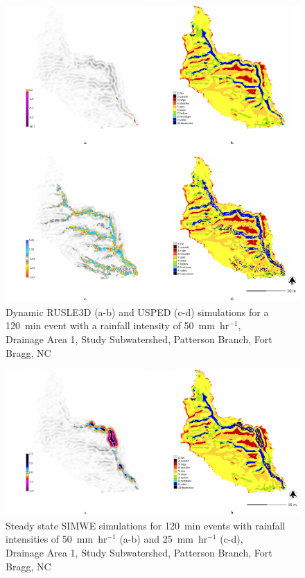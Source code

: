 \documentclass[gmd, manuscript]{copernicus}
\begin{document}
\begin{figure}
\center
\includegraphics[width=\textwidth,height=0.925\textheight,keepaspectratio]{figures/simulations.pdf}
\caption{Dynamic RUSLE3D (a-b) and USPED (c-d) simulations
for a 120~\unit{min} event with a rainfall intensity of 50~\unit{mm~hr}$^{-1}$,\\
Drainage Area 1, Study Subwatershed, Patterson Branch, Fort Bragg, NC}
\label{fig:simulations}
\end{figure}

\begin{figure}
\center
\includegraphics[width=\textwidth,height=0.95\textheight,keepaspectratio]{figures/simwe.pdf}
\caption{Steady state SIMWE simulations
for 120~\unit{min} events with rainfall intensities of 50~\unit{mm~hr}$^{-1}$ (a-b)
and 25~\unit{mm~hr}$^{-1}$ (c-d),\\
Drainage Area 1, Study Subwatershed, Patterson Branch, Fort Bragg, NC}
\label{fig:simwe_simulations}
\end{figure}
\end{document}
